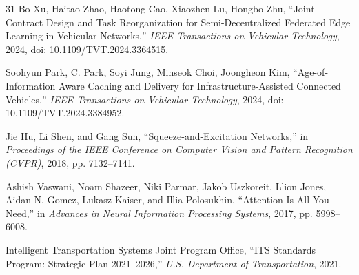 \documentclass[journal]{IEEEtran}
\begin{document}
\begin{thebibliography}{31}
Bo Xu, Haitao Zhao, Haotong Cao, Xiaozhen Lu, Hongbo Zhu, ``Joint Contract Design and Task Reorganization for Semi-Decentralized Federated Edge Learning in Vehicular Networks,'' \textit{IEEE Transactions on Vehicular Technology}, 2024, doi: 10.1109/TVT.2024.3364515.

Soohyun Park, C. Park, Soyi Jung, Minseok Choi, Joongheon Kim, ``Age-of-Information Aware Caching and Delivery for Infrastructure-Assisted Connected Vehicles,'' \textit{IEEE Transactions on Vehicular Technology}, 2024, doi: 10.1109/TVT.2024.3384952.

Jie Hu, Li Shen, and Gang Sun, ``Squeeze-and-Excitation Networks,'' in \textit{Proceedings of the IEEE Conference on Computer Vision and Pattern Recognition (CVPR)}, 2018, pp. 7132--7141.

Ashish Vaswani, Noam Shazeer, Niki Parmar, Jakob Uszkoreit, Llion Jones, Aidan N. Gomez, Lukasz Kaiser, and Illia Polosukhin, ``Attention Is All You Need,'' in \textit{Advances in Neural Information Processing Systems}, 2017, pp. 5998--6008.

Intelligent Transportation Systems Joint Program Office, ``ITS Standards Program: Strategic Plan 2021--2026,'' \textit{U.S. Department of Transportation}, 2021.

\end{thebibliography}
\end{document}
